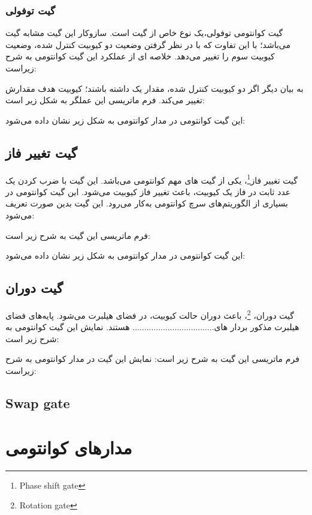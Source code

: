 \documentclass{book}
\begin{document}
\subsubsection*{گیت توفولی}
گیت کوانتومی توفولی،‌یک نوع خاص از گیت  است. سازوکار این گیت مشابه گیت  می‌‌باشد؛‌ با این تفاوت که با در نظر گرفتن وضعیت دو کیوبیت کنترل شده، وضعیت کیوبیت سوم را تغییر می‌دهد. خلاصه ای از عملکرد این گیت کوانتومی به شرح زیراست:

به بیان دیگر اگر دو کیوبیت کنترل شده،‌ مقدار یک داشته باشند؛‌ کیوبیت هدف مقدارش تغییر می‌کند.
فرم ماتریسی این عملگر به شکل زیر است:

این گیت کوانتومی در مدار کوانتومی به شکل زیر نشان داده می‌شود:

\subsection*{گیت تغییر فاز}
گیت تغییر فاز\footnote{Phase shift gate}، یکی از گیت های مهم کوانتومی‌ می‌باشد. این گیت با ضرب کردن یک عدد ثابت در فاز یک کیوبیت، باعث تغییر فاز کیوبیت می‌شود. این گیت کوانتومی در بسیاری از الگوریتم‌های سرچ کوانتومی به‌کار می‌رود. این گیت بدین صورت تعریف می‌شود:

فرم ماتریسی این گیت به شرح زیر است:

این گیت کوانتومی در مدار کوانتومی به شکل زیر نشان داده می‌شود:

\subsection*{گیت دوران}
گیت دوران، \footnote{Rotation gate}، باعث دوران حالت کیوبیت، در فضای هیلبرت ‌می‌شود. پایه‌های فضای هیلبرت مذکور بردار های................................... هستند. نمایش این گیت کوانتومی به شرح زیر است:

فرم ماتریسی این گیت به شرح زیر است:
نمایش این گیت در مدار کوانتومی به شرح زیراست:


\subsection{Swap gate}




\section{مدار‌های کوانتومی}
\end{document}
